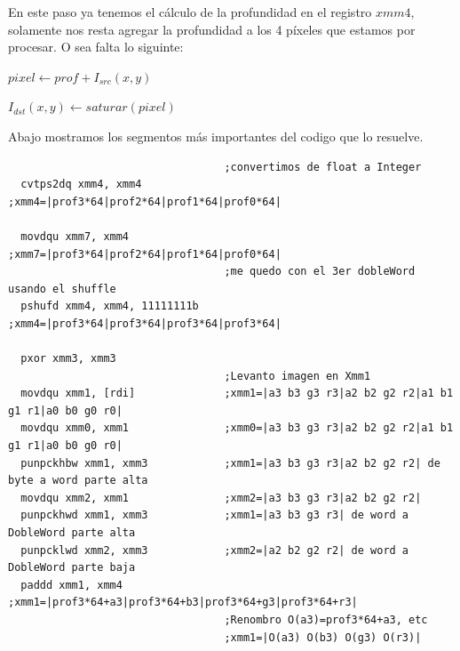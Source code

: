 En este paso ya tenemos el cálculo de la profundidad en el registro $xmm4$, solamente nos resta agregar la profundidad a los 4 píxeles que estamos por procesar. O sea falta lo siguinte:

\begin{center}
       $pixel \gets prof + I_{src}(x, y)$    
      
      $I_{dst}(x, y) \gets saturar(pixel)$
\end{center}

Abajo mostramos los segmentos más importantes del codigo que lo resuelve.

\begin{codesnippet}
\begin{verbatim}
                                  ;convertimos de float a Integer
  cvtps2dq xmm4, xmm4             ;xmm4=|prof3*64|prof2*64|prof1*64|prof0*64|

  movdqu xmm7, xmm4               ;xmm7=|prof3*64|prof2*64|prof1*64|prof0*64|
                                  ;me quedo con el 3er dobleWord usando el shuffle
  pshufd xmm4, xmm4, 11111111b    ;xmm4=|prof3*64|prof3*64|prof3*64|prof3*64|

  pxor xmm3, xmm3
                                  ;Levanto imagen en Xmm1
  movdqu xmm1, [rdi]              ;xmm1=|a3 b3 g3 r3|a2 b2 g2 r2|a1 b1 g1 r1|a0 b0 g0 r0|			
  movdqu xmm0, xmm1               ;xmm0=|a3 b3 g3 r3|a2 b2 g2 r2|a1 b1 g1 r1|a0 b0 g0 r0|
  punpckhbw xmm1, xmm3            ;xmm1=|a3 b3 g3 r3|a2 b2 g2 r2| de byte a word parte alta
  movdqu xmm2, xmm1               ;xmm2=|a3 b3 g3 r3|a2 b2 g2 r2| 
  punpckhwd xmm1, xmm3            ;xmm1=|a3 b3 g3 r3| de word a DobleWord parte alta
  punpcklwd xmm2, xmm3            ;xmm2=|a2 b2 g2 r2| de word a DobleWord parte baja
  paddd xmm1, xmm4                ;xmm1=|prof3*64+a3|prof3*64+b3|prof3*64+g3|prof3*64+r3|
                                  ;Renombro O(a3)=prof3*64+a3, etc
                                  ;xmm1=|O(a3) O(b3) O(g3) O(r3)|
\end{verbatim}
\end{codesnippet}

